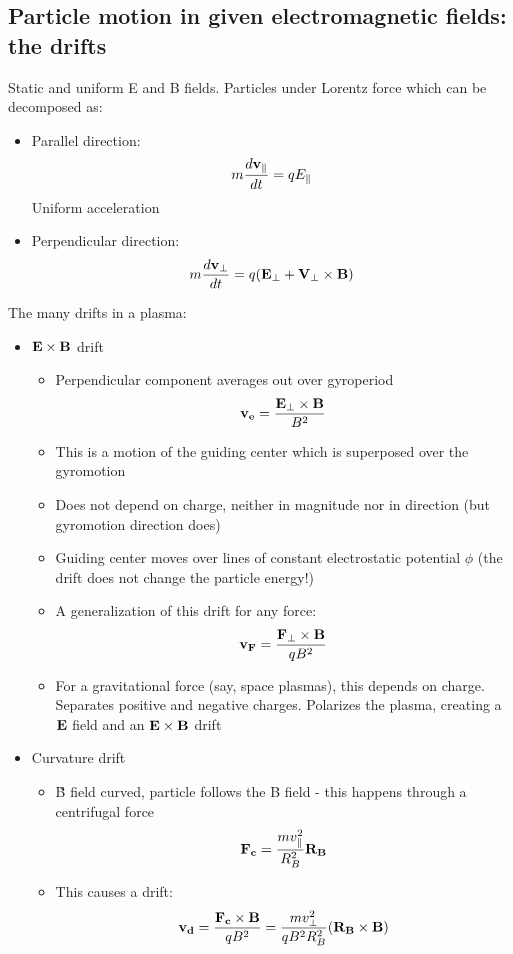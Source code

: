 \documentclass[PlasmaNotes.tex]{subfiles}
\begin{document}
	\subsection{Particle motion in given electromagnetic fields: the drifts }
Static and uniform E and B fields. Particles under Lorentz force which can be decomposed as:
	\begin{itemize}
		\item Parallel direction: \[m\frac{d \mathbf{v_{\parallel}}}{d t}=qE_{\parallel}\]
	Uniform acceleration
		\item Perpendicular direction: \[m\frac{d \mathbf{v_{\perp}}}{d t}=q(\mathbf{E_{\perp}} + \mathbf{V_{	\perp}}\times\mathbf{B})\]
	\end{itemize}
The many drifts in a plasma:
	\begin{itemize}
		\item $\mathbf{E}\times\mathbf{B}$ drift
		\begin{itemize}
			\item Perpendicular component averages out over gyroperiod
			\[\mathbf{v_e}=\frac{\mathbf{E_{\perp}}\times\mathbf{B}}{B^2}\]
			\item This is a motion of the guiding center which is superposed over the gyromotion
			\item Does not depend on charge, neither in magnitude nor in direction (but gyromotion direction does)
			\item Guiding center moves over lines of constant electrostatic potential $\phi$ (the drift does not change the particle energy!)
			\item A generalization of this drift for any force: \[\mathbf{v_F}=\frac{\mathbf{F_{\perp}}\times\mathbf{B}}{qB^2}\]
			\item For a gravitational force (say, space plasmas), this depends on charge. Separates positive and negative charges. Polarizes the plasma, creating a $\mathbf{E}$ field and an $\mathbf{E}\times\mathbf{B}$ drift
		\end{itemize}
		
		\item Curvature drift
		\begin{itemize}
			\item \v{B} field curved, particle follows the B field - this happens through a centrifugal force
			\[\mathbf{F_c}=\frac{m v_{\parallel}^2}{R_B^2} \mathbf{R_B}\]
			\item This causes a drift:
			\[\mathbf{v_d} = \frac{\mathbf{F_c} \times \mathbf{B}}{q B^2} = \frac{m v_{\perp}^2}{q B^2 R_B^2} (\mathbf{R_B} \times \mathbf{B})\]
		\end{itemize}
		

\end{itemize}
\end{document}
